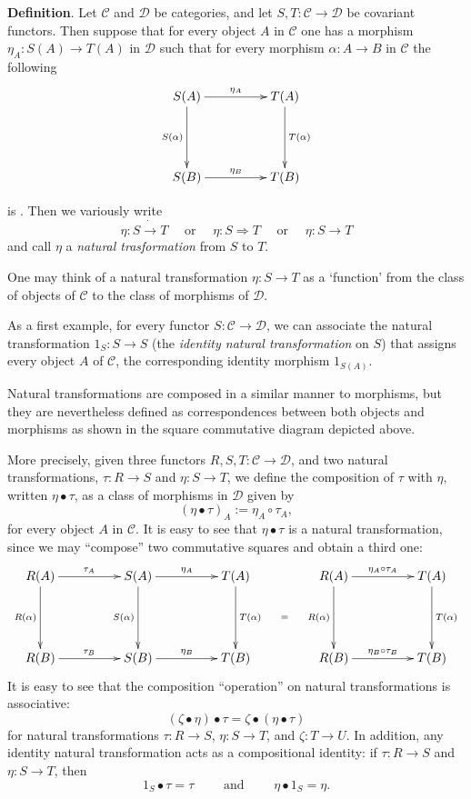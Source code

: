 \documentclass{article}
\begin{document}
\textbf{Definition}.
Let $\mathcal{C}$ and $\mathcal{D}$ be categories, and let 
$S,T:\mathcal{C}\to\mathcal{D}$ be covariant functors. Then suppose
that for every object $A$ in $\mathcal{C}$ one has a morphism 
$\eta_A :  S(A) \to T(A) $ in $\mathcal{D}$ such that for every morphism 
$\alpha: A \to B$ in $\mathcal{C}$ the following
$$
\xymatrix@+=4pc{S(A) \ar[d]_{S(\alpha)} \ar[r]^{\eta_A} & T(A) \ar[d]^{T(\alpha)} \\
S(B) \ar[r]^{\eta_{B}} & T(B)
}
$$

is .  Then we variously write 
$$\eta: S \dot{\to} T \quad\mbox{ or }\quad \eta: S\Rightarrow T\quad \mbox{ or } \quad \eta:S\to T$$ and call $\eta$ a 
\emph{natural trasformation} from $S$ to $T$.

One may think of a natural transformation $\eta:S\to T$ as a `function' from the class of objects of $\mathcal{C}$ to the class of morphisms of $\mathcal{D}$.

As a first example, for every functor $S:\mathcal{C}\to \mathcal{D}$, we can associate the natural transformation $1_S: S\to S$ (the \emph{identity natural transformation} on $S$) that assigns every object $A$ of $\mathcal{C}$, the corresponding identity morphism $1_{S(A)}$.

Natural transformations are composed in a similar manner to morphisms, but they are nevertheless defined as correspondences between both objects and morphisms as shown in the square commutative diagram depicted above. 

 More precisely, given three functors $R,S,T:\mathcal{C}\to \mathcal{D}$, and two natural transformations, $\tau:R\to S$ and $\eta:S\to T$, we define the composition of $\tau$ with $\eta$, written $\eta \bullet \tau$, as a class of morphisms in $\mathcal{D}$ given by 
$$(\eta\bullet \tau)_A := \eta_A\circ \tau_A,$$ for every object $A$ in $\mathcal{C}$.
It is easy to see that $\eta\bullet \tau$ is a natural transformation, since we may ``compose'' two commutative squares and obtain a third one:
$$
\xymatrix@+=4pc{R(A) \ar[d]_{R(\alpha)} \ar[r]^{\tau_A}  & S(A) \ar[d]_{S(\alpha)} \ar[r]^{\eta_A} & T(A) \ar[d]^{T(\alpha)} \ar@{}[dr]|{=} &  
R(A) \ar[d]_{R(\alpha)} \ar[r]^{\eta_A \circ \tau_A} & T(A) \ar[d]^{T(\alpha)} 
\\
R(B) \ar[r]^{\tau_{B}} & S(B) \ar[r]^{\eta_{B}} & T(B) & 
R(B) \ar[r]^{\eta_B \circ \tau_B} & T(B)
}
$$
It is easy to see that the composition ``operation'' on natural transformations is associative:
$$(\zeta\bullet \eta)\bullet \tau = \zeta\bullet (\eta \bullet \tau)$$
for natural transformations $\tau:R\to S$, $\eta:S\to T$, and $\zeta:T\to U$.  In addition, any identity natural transformation acts as a compositional identity: if $\tau:R\to S$ and $\eta:S\to T$, then $$1_S\bullet \tau=\tau \qquad\mbox{ and }\qquad \eta \bullet 1_S = \eta.$$
\end{document}
